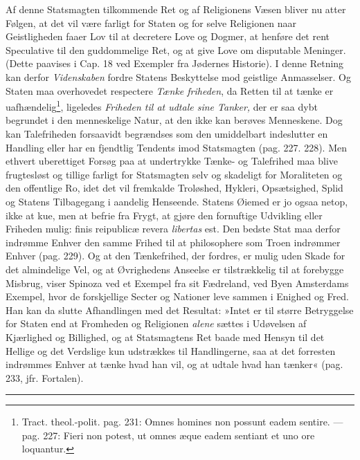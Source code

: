 \documentclass[12pt,a4paper]{book}
\newcommand{\opage}[1]{\marginnote{\footnotesize\textit{[#1]}}}
\begin{document}
Af denne Statsmagten tilkommende Ret og af Religionens Væsen bliver nu atter Følgen, at det vil være farligt for Staten og for selve Religionen naar Geistligheden faaer Lov til at decretere Love og Dogmer, at henføre det rent Speculative til den guddommelige Ret, og at give Love om disputable Meninger. (Dette paavises i Cap. 18 ved Exempler fra Jødernes Historie). I denne Retning kan derfor \emph{Videnskaben} fordre Statens Beskyttelse mod geistlige Anmasselser. Og Staten maa overhovedet respectere \emph{Tænke\-%
\opage{161}\setcounter{footnote}{0}%
friheden}, da Retten til at tænke er uafhændelig\footnote{Tract. theol.-polit. pag. 231: Omnes homines non possunt eadem sentire. --- pag. 227: Fieri non potest, ut omnes æque eadem sentiant et uno ore loquantur.}, ligeledes \emph{Friheden til at udtale sine Tanker,} der er saa dybt begrundet i den menneskelige Natur, at den ikke kan berøves Menneskene. Dog kan Talefriheden forsaavidt begrændses som den umiddelbart indeslutter en Handling eller har en fjendtlig Tendents imod Statsmagten (pag. 227. 228). Men ethvert uberettiget Forsøg paa at undertrykke Tænke- og Talefrihed maa blive frugtesløst og tillige farligt for Statsmagten selv og skadeligt for Moraliteten og den offentlige Ro, idet det vil fremkalde Troløshed, Hykleri, Opsætsighed, Splid og Statens Tilbagegang i aandelig Henseende. Statens Øiemed er jo ogsaa netop, ikke at kue, men at befrie fra Frygt, at gjøre den fornuftige Udvikling eller Friheden mulig: finis reipublicæ revera \emph{libertas} est. Den bedste Stat maa derfor indrømme Enhver den samme Frihed til at philosophere som Troen indrømmer Enhver (pag. 229). Og at den Tænkefrihed, der fordres, er mulig uden Skade for det almindelige Vel, og at Øvrighedens Anseelse er tilstrækkelig til at forebygge Misbrug, viser Spinoza ved et Exempel fra sit Fædreland, ved Byen Amsterdams Exempel, hvor de forskjellige Secter og Nationer leve sammen i Enighed og Fred. Han kan da slutte Afhandlingen med det Resultat: »Intet er til større Betryggelse for Staten end at Fromheden og Religionen \emph{alene} sættes i Udøvelsen af Kjærlighed og Billighed, og at Statsmagtens Ret baade med Hensyn til det Hellige og det Verdslige kun udstrækkes til Handlingerne, saa at det forresten indrømmes Enhver at tænke hvad han vil, og at udtale hvad han tænker« (pag. 233, jfr. Fortalen).

\bigskip
\begin{center}\rule{2.5cm}{0.4pt}\end{center}
\bigskip
\end{document}
